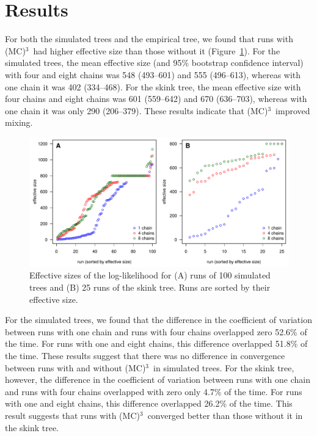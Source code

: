 \documentclass[12pt]{article}
\newcommand{\MCMCMC}{(MC)$^{3}$}
\begin{document}
\section*{Results}

For both the simulated trees and the empirical tree,
we found that runs with \MCMCMC\ had higher effective size
than those without it (Figure~\ref{fig:eff-size}).
%
For the simulated trees,
the mean effective size (and 95\% bootstrap confidence interval)
with four and eight chains was 548 (493--601) and 555 (496--613),
whereas with one chain it was 402 (334--468).
%
For the skink tree, the mean effective size
with four chains and eight chains was 601 (559--642) and 670 (636--703),
whereas with one chain it was only 290 (206--379).
%
These results indicate that \MCMCMC\ improved mixing.

\begin{figure}
\begin{center}
\includegraphics[width=14cm]{eff-size.pdf}
\end{center}
\caption{Effective sizes of the log-likelihood for
    (A) runs of 100 simulated trees and (B) 25 runs of the skink tree.
    Runs are sorted by their effective size.}
\label{fig:eff-size}
\end{figure}


For the simulated trees,
we found that the difference in the coefficient of variation
between runs with one chain and runs with four chains
overlapped zero 52.6\% of the time.
%
For runs with one and eight chains,
this difference overlapped 51.8\% of the time.
%
These results suggest that there was no difference
in convergence between runs with and without \MCMCMC\ in simulated trees.
%
For the skink tree, however,
the difference in the coefficient of variation
between runs with one chain and runs with four chains
overlapped with zero only 4.7\% of the time.
%
For runs with one and eight chains,
this difference overlapped 26.2\% of the time.
%
This result suggests that runs with \MCMCMC\ 
converged better than those without it in the skink tree.
\end{document}
